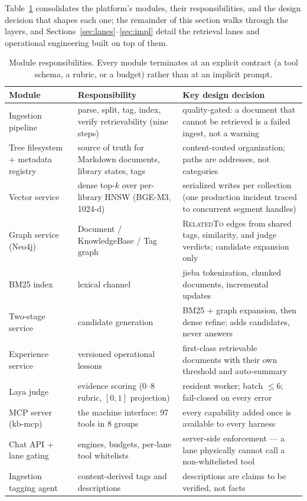 \documentclass[preprint,12pt]{elsarticle}
\begin{document}
Table~\ref{tab:modules} consolidates the platform's modules, their
responsibilities, and the design decision that shapes each one; the
remainder of this section walks through the layers, and
Sections~\ref{sec:lanes}--\ref{sec:impl} detail the retrieval lanes and
operational engineering built on top of them.

\begin{table}[!htbp]
\centering
\footnotesize
\setlength{\tabcolsep}{3.5pt}
\caption{Module responsibilities. Every module terminates at an explicit
contract (a tool schema, a rubric, or a budget) rather than at an
implicit prompt.}
\label{tab:modules}
\begin{tabular}{p{2.9cm}p{4.1cm}p{6.0cm}}
\toprule
Module & Responsibility & Key design decision \\
\midrule
Ingestion pipeline & parse, split, tag, index, verify retrievability
(nine steps) & quality-gated: a document that cannot be retrieved is a
failed ingest, not a warning \\
Tree filesystem + metadata registry & source of truth for Markdown
documents, library states, tags & content-routed organization; paths are
addresses, not categories \\
Vector service & dense top-$k$ over per-library HNSW (BGE-M3, 1024-d) &
serialized writes per collection (one production incident traced to
concurrent segment handles) \\
Graph service (Neo4j) & Document / KnowledgeBase / Tag graph &
\textsc{RelatedTo} edges from shared tags, similarity, and judge
verdicts; candidate expansion only \\
BM25 index & lexical channel & jieba tokenization, chunked documents,
incremental updates \\
Two-stage service & candidate generation & BM25 + graph expansion, then
dense refine; adds candidates, never answers \\
Experience service & versioned operational lessons & first-class
retrievable documents with their own threshold and auto-summary \\
Laya judge & evidence scoring (0--8 rubric, $[0,1]$ projection) &
resident worker; batch $\leq 6$; fail-closed on every error \\
MCP server (kb-mcp) & the machine interface: 97 tools in 8 groups &
every capability added once is available to every harness \\
Chat API + lane gating & engines, budgets, per-lane tool whitelists &
server-side enforcement --- a lane physically cannot call a
non-whitelisted tool \\
Ingestion tagging agent & content-derived tags and descriptions &
descriptions are claims to be verified, not facts \\
\bottomrule
\end{tabular}
\end{table}
\end{document}
